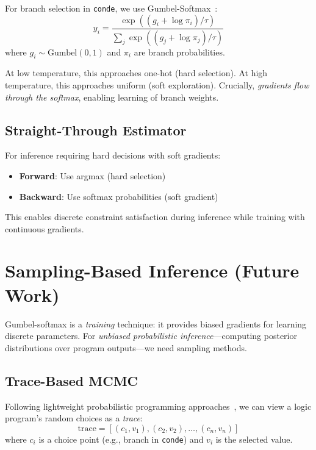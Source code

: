 \documentclass[11pt,a4paper]{article}
\begin{document}
For branch selection in \texttt{conde}, we use Gumbel-Softmax~\cite{gumbel_softmax_chirho}:
\[
y_i = \frac{\exp((g_i + \log \pi_i) / \tau)}{\sum_j \exp((g_j + \log \pi_j) / \tau)}
\]
where $g_i \sim \text{Gumbel}(0, 1)$ and $\pi_i$ are branch probabilities.

At low temperature, this approaches one-hot (hard selection).
At high temperature, this approaches uniform (soft exploration).
Crucially, \emph{gradients flow through the softmax}, enabling learning of branch weights.

\subsection{Straight-Through Estimator}
\label{subsec:ste_chirho}

For inference requiring hard decisions with soft gradients:
\begin{itemize}
  \item \textbf{Forward}: Use argmax (hard selection)
  \item \textbf{Backward}: Use softmax probabilities (soft gradient)
\end{itemize}

This enables discrete constraint satisfaction during inference while training with continuous gradients.

\section{Sampling-Based Inference (Future Work)}
\label{sec:sampling_inference_chirho}

Gumbel-softmax is a \emph{training} technique: it provides biased gradients for learning discrete parameters.
For \emph{unbiased probabilistic inference}---computing posterior distributions over program outputs---we need sampling methods.

\subsection{Trace-Based MCMC}
\label{subsec:trace_mcmc_chirho}

Following lightweight probabilistic programming approaches~\cite{lightweight_mcmc_chirho}, we can view a logic program's random choices as a \emph{trace}:
\[
\text{trace} = [(c_1, v_1), (c_2, v_2), \ldots, (c_n, v_n)]
\]
where $c_i$ is a choice point (e.g., branch in \texttt{conde}) and $v_i$ is the selected value.
\end{document}
